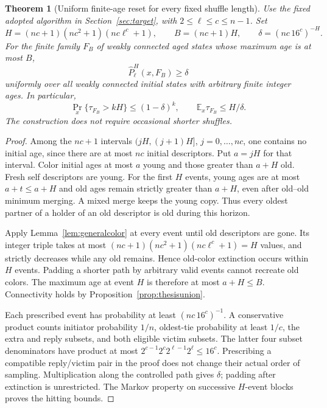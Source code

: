 \documentclass[11pt]{article}
\newtheorem{theorem}{Theorem}
\begin{document}
\begin{theorem}[Uniform finite-age reset for every fixed shuffle length]
\label{thm:thesisgeneralreset}
Use the fixed adopted algorithm in Section~\ref{sec:target},
with $2\le\ell\le c\le n-1$. Set
\[
 H=(nc+1)(nc^2+1)(nc\ell^c+1),\qquad
 B=(nc+1)H,\qquad
 \delta=(nc\,16^c)^{-H}.
\]
For the finite family $F_B$ of weakly connected aged states
whose maximum age is at most $B$,
\[
 \widehat P_\ell^H(x,F_B)\ge\delta
\]
uniformly over all weakly connected initial states with
arbitrary finite integer ages. In particular,
\[
 \Pr_x\{\tau_{F_B}>kH\}\le(1-\delta)^k,\qquad
 \mathbb E_x\tau_{F_B}\le H/\delta.
\]
The construction does not require occasional shorter shuffles.
\end{theorem}
\begin{proof}
Among the $nc+1$ intervals $(jH,(j+1)H]$, $j=0,\ldots,nc$,
one contains no initial age, since there are at most $nc$
initial descriptors. Put $a=jH$ for that interval.
Color initial ages at most $a$ young and those greater
than $a+H$ old. Fresh self descriptors are young.
For the first $H$ events, young ages are at most $a+t\le a+H$
and old ages remain strictly greater than $a+H$, even after
old--old minimum merging. A mixed merge keeps the young copy.
Thus every oldest partner of a holder of an old descriptor
is old during this horizon.

Apply Lemma~\ref{lem:generalcolor} at every event until
old descriptors are gone. Its integer triple takes at most
$(nc+1)(nc^2+1)(nc\ell^c+1)=H$ values, and strictly decreases
while any old remains. Hence old-color extinction occurs
within $H$ events. Padding a shorter path by arbitrary
valid events cannot recreate old colors. The maximum age
at event $H$ is therefore at most $a+H\le B$.
Connectivity holds by Proposition~\ref{prop:thesisunion}.

Each prescribed event has probability at least
$(nc\,16^c)^{-1}$. A conservative product counts initiator
probability $1/n$, oldest-tie probability at least $1/c$,
the extra and reply subsets, and both eligible victim subsets.
The latter four subset denominators have product at most
$2^{c-1}2^c2^{\ell-1}2^\ell\le16^c$.
Prescribing a compatible reply/victim pair in the proof
does not change their actual order of sampling.
Multiplication along the controlled path gives $\delta$;
padding after extinction is unrestricted.
The Markov property on successive $H$-event blocks proves
the hitting bounds.
\end{proof}
\end{document}
